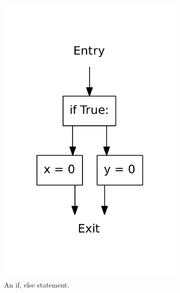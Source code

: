 \begin{figure}
\begin{subfigure}[b]{0.3\textwidth}
    \includegraphics[scale=.5]{./figures/if_else.pdf}
    \caption{An if, else statement.}
    \label{fig:if:if_else}
  \end{subfigure}
  ~ %
  \begin{subfigure}[b]{0.3\textwidth}

\end{subfigure}
\end{figure}
